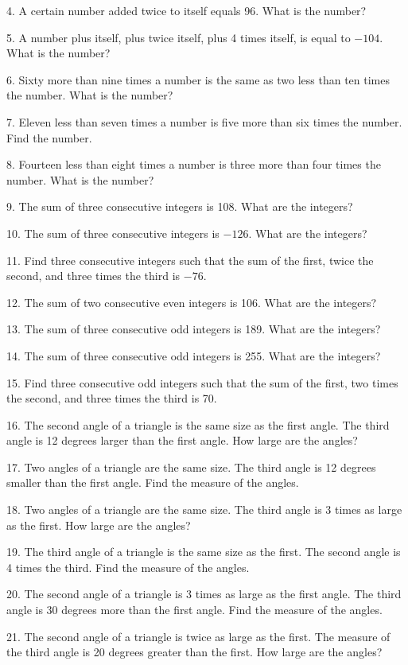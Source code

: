 \documentclass[11pt]{book}
\theoremstyle{definition}  %
\begin{document}
4. A certain number added twice to itself equals 96. What is the number?

5. A number plus itself, plus twice itself, plus 4 times itself, is equal to
$- 104$. What is the number?

6. Sixty more than nine times a number is the same as two less than ten times
the number. What is the number?

7. Eleven less than seven times a number is five more than six times the
number. Find the number.

8. Fourteen less than eight times a number is three more than four times the number. What is the number?

9. The sum of three consecutive integers is 108. What are the integers?

10. The sum of three consecutive integers is $- 126$. What are the integers?

11. Find three consecutive integers such that the sum of the first, twice the
second, and three times the third is $- 76$.

12. The sum of two consecutive even integers is 106. What are the integers?

13. The sum of three consecutive odd integers is 189. What are the integers?

14. The sum of three consecutive odd integers is 255. What are the integers?

15. Find three consecutive odd integers such that the sum of the first, two
times the second, and three times the third is 70.

16. The second angle of a triangle is the same size as the first angle. The
third angle is 12 degrees larger than the first angle. How
large are the angles?

17. Two angles of a triangle are the same size. The third angle is 12 degrees
smaller than the first angle. Find the measure of the
angles.

18. Two angles of a triangle are the same size. The third angle is 3 times as
large as the first. How large are the angles?

19. The third angle of a triangle is the same size as the first. The second
angle is 4 times the third. Find the measure of the angles.

\pagebreak

20. The second angle of a triangle is 3 times as large as the first angle. The
third angle is 30 degrees more than the first angle. Find the
measure of the angles.

21. The second angle of a triangle is twice as large as the first. The measure
of the third angle is 20 degrees greater than the first. How
large are the angles?
\end{document}
